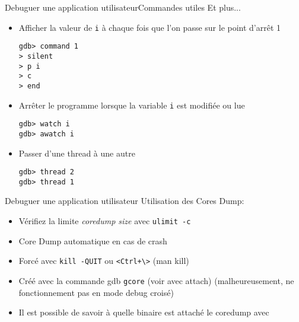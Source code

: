\begin{frame}[fragile=singleslide]{Debuguer une application utilisateur}{Commandes utiles}
  Et plus...
  \begin{itemize}
  \item Afficher  la valeur de \verb+i+  à chaque fois  que l'on passe
    sur le point d'arrêt 1
    \begin{lstlisting}
gdb> command 1
> silent
> p i
> c
> end
    \end{lstlisting}
  \item Arrêter le programme lorsque la variable \verb+i+ est modifiée
    ou lue
    \begin{lstlisting}
gdb> watch i
gdb> awatch i
      \end{lstlisting}
    \item Passer d'une thread à une autre
      \begin{lstlisting}
gdb> thread 2
gdb> thread 1
      \end{lstlisting}
    \end{itemize}
\end{frame}

\begin{frame}[fragile=singleslide]{Debuguer une application utilisateur}
  Utilisation des Cores Dump:
  \begin{itemize}
  \item Vérifiez la limite \emph{coredump size} avec \texttt{ulimit -c}
  \item Core Dump automatique en cas de crash
  \item Forcé avec \texttt{kill -QUIT} ou \verb|<Ctrl+\>| (man kill)
  \item Créé  avec la commande  gdb \texttt{gcore} (voir  avec attach)
    (malheureusement, ne fonctionnement pas en mode debug croisé)
  \item  Il est possible  de savoir  à quelle  binaire est  attaché le
    coredump avec 
  \end{itemize}
\end{frame}

